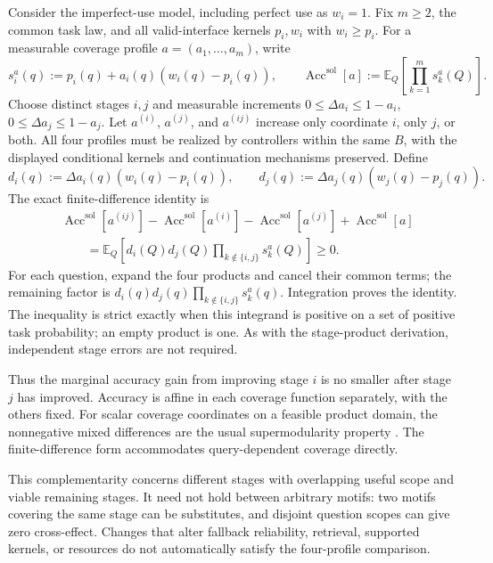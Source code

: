 \documentclass[10pt]{article} %
\providecommand{\1}{\mathbf{1}}  %
\theoremstyle{remark}
\theoremstyle{definition}
\begin{document}
Consider the imperfect-use model, including perfect use as $w_i=1$.
Fix $m\geq2$, the common task law, and all valid-interface kernels
$p_i,w_i$ with $w_i\geq p_i$. For a measurable coverage profile
$a=(a_1,\ldots,a_m)$, write
\[
s_i^a(q):=p_i(q)+a_i(q)(w_i(q)-p_i(q)),
\qquad
\operatorname{Acc}^{\mathrm{sol}}[a]
:=\mathbb E_Q\!\left[\prod_{k=1}^{m}s_k^a(Q)\right].
\]
Choose distinct stages $i,j$ and measurable increments
$0\leq\Delta a_i\leq1-a_i$, $0\leq\Delta a_j\leq1-a_j$.
Let $a^{(i)}$, $a^{(j)}$, and $a^{(ij)}$ increase only coordinate $i$,
only $j$, or both. All four profiles must be realized by controllers
within the same $B$, with the displayed conditional kernels and
continuation mechanisms preserved. Define
\[
d_i(q):=\Delta a_i(q)(w_i(q)-p_i(q)),
\qquad
d_j(q):=\Delta a_j(q)(w_j(q)-p_j(q)).
\]
The exact finite-difference identity is
\begin{equation}
\begin{split}
&\operatorname{Acc}^{\mathrm{sol}}[a^{(ij)}]
-\operatorname{Acc}^{\mathrm{sol}}[a^{(i)}]
-\operatorname{Acc}^{\mathrm{sol}}[a^{(j)}]
+\operatorname{Acc}^{\mathrm{sol}}[a]\\
&\qquad=\mathbb E_Q\!\left[
d_i(Q)d_j(Q)\prod_{k\notin\{i,j\}}s_k^a(Q)\right]\geq0.
\end{split}
\label{eq:reuse-coverage-complementarity}
\end{equation}
For each question, expand the four products and cancel their common
terms; the remaining factor is
$d_i(q)d_j(q)\prod_{k\notin\{i,j\}}s_k^a(q)$. Integration proves the
identity. The inequality is strict exactly when this integrand is
positive on a set of positive task probability; an empty product is one.
As with the stage-product derivation, independent stage errors are not
required.

Thus the marginal accuracy gain from improving stage $i$ is no smaller
after stage $j$ has improved. Accuracy is affine in each coverage
function separately, with the others fixed. For scalar coverage
coordinates on a feasible product domain, the nonnegative mixed
differences are the usual supermodularity property
\citep[Section~2.6.1]{topkis1998supermodularity}. The finite-difference
form accommodates query-dependent coverage directly.

This complementarity concerns different stages with overlapping useful
scope and viable remaining stages. It need not hold between arbitrary
motifs: two motifs covering the same stage can be substitutes, and
disjoint question scopes can give zero cross-effect. Changes that alter
fallback reliability, retrieval, supported kernels, or resources do not
automatically satisfy the four-profile comparison.
\end{document}
